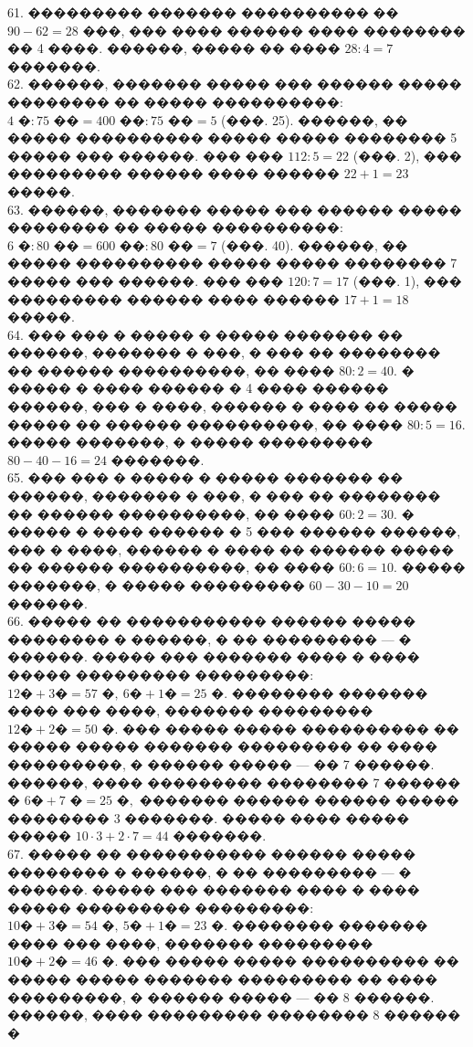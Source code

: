 \documentclass[12pt]{article}
\begin{document}
61. ��������� ������� ���������� �� $90-62=28$ ���, ��� ���� ������ ���� �������� �� 4 ����. ������, ����� �� ���� $28:4=7$ �������.\\
62. ������, ������� ����� ��� ������ ����� �������� �� ����� ����������: $4\text{ �}:75\text{ ��}=400\text{ ��}:75\text{ ��}=5$ (���. 25). ������, �� ����� ���������� ����� ����� �������� 5 ����� ��� ������. ��� ��� $112:5=22$ (���. 2), ��� ��������� ������ ���� ������ $22+1=23$ �����.\\
63. ������, ������� ����� ��� ������ ����� �������� �� ����� ����������: $6\text{ �}:80\text{ ��}=600\text{ ��}:80\text{ ��}=7$ (���. 40). ������, �� ����� ���������� ����� ����� �������� 7 ����� ��� ������. ��� ��� $120:7=17$ (���. 1), ��� ��������� ������ ���� ������ $17+1=18$ �����.\\
64. ��� ��� � ����� � ����� ������� �� ������, ������� � ���, � ��� �� �������� �� ������ ����������, �� ���� $80:2=40.$ � ����� � ���� ������ � 4 ���� ������ ������, ��� � ����, ������ � ���� �� ����� ����� �� ������ ����������, �� ���� $80:5=16.$ ����� �������, � ����� ��������� $80-40-16=24$ �������.\\
65. ��� ��� � ����� � ����� ������� �� ������, ������� � ���, � ��� �� �������� �� ������ ����������, �� ���� $60:2=30.$ � ����� � ���� ������ � 5 ��� ������ ������, ��� � ����, ������ � ���� �� ������ ����� �� ������ ����������, �� ���� $60:6=10.$ ����� �������, � ����� ��������� $60-30-10=20$ ������.\\
66. ����� �� ����������� ������ ����� �������� � ������, � �� ��������� --- � ������. ����� ��� ������� ���� � ���� ����� ��������� ���������: $12\text{�}+3\text{�}=57\text{ �},\ 6\text{�}+1\text{�}=25\text{ �}.$ �������� ������� ���� ��� ����, ������� ��������� $12\text{�}+2\text{�}=50\text{ �}.$ ��� ����� ����� ���������� �� ����� ����� ������� ��������� �� ���� ���������, � ������ ����� --- �� 7 ������. ������, ���� ��������� �������� 7 ������ �
$6\text{�}+7\text{ �}=25\text{ �},$ ������� ������ ������ ����� �������� 3 �������. ����� ���� ����� ����� $10\cdot3+2\cdot7=44$ �������.\\
67. ����� �� ����������� ������ ����� �������� � ������, � �� ��������� --- � ������. ����� ��� ������� ���� � ���� ����� ��������� ���������: $10\text{�}+3\text{�}=54\text{ �},\ 5\text{�}+1\text{�}=23\text{ �}.$ �������� ������� ���� ��� ����, ������� ��������� $10\text{�}+2\text{�}=46\text{ �}.$ ��� ����� ����� ���������� �� ����� ����� ������� ��������� �� ���� ���������, � ������ ����� --- �� 8 ������. ������, ���� ��������� �������� 8 ������ �
\end{document}
